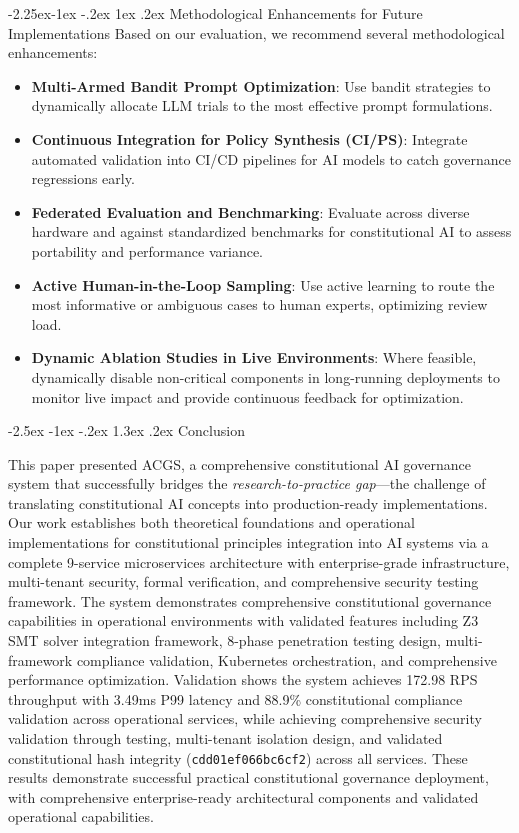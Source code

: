 \documentclass[manuscript,screen,9pt]{acmart}
\makeatletter
\renewcommand\section{\@startsection{section}{1}{\z@}%
  {-2.5ex \@plus -1ex \@minus -.2ex}%
  {1.3ex \@plus.2ex}%
  {\normalfont\Large\bfseries}}
\renewcommand\subsection{\@startsection{subsection}{2}{\z@}%
  {-2.25ex\@plus -1ex \@minus -.2ex}%
  {1ex \@plus .2ex}%
  {\normalfont\large\bfseries}}
\makeatother
\begin{document}
\subsection{Methodological Enhancements for Future Implementations}
\label{subsec:methodology_optimization}
Based on our evaluation, we recommend several methodological enhancements:
\begin{itemize}[leftmargin=*,itemsep=1pt,parsep=1pt]
	\item \textbf{Multi-Armed Bandit Prompt Optimization}: Use bandit strategies to dynamically allocate LLM trials to the most effective prompt formulations.
	\item \textbf{Continuous Integration for Policy Synthesis (CI/PS)}: Integrate automated validation into CI/CD pipelines for AI models to catch governance regressions early.
	\item \textbf{Federated Evaluation and Benchmarking}: Evaluate across diverse hardware and against standardized benchmarks for constitutional AI to assess portability and performance variance.
	\item \textbf{Active Human-in-the-Loop Sampling}: Use active learning to route the most informative or ambiguous cases to human experts, optimizing review load.
	\item \textbf{Dynamic Ablation Studies in Live Environments}: Where feasible, dynamically disable non-critical components in long-running deployments to monitor live impact and provide continuous feedback for optimization.
\end{itemize}


\section{Conclusion}
\label{sec:conclusion}

This paper presented ACGS, a comprehensive constitutional AI governance system that successfully bridges the \textit{research-to-practice gap}—the challenge of translating constitutional AI concepts into production-ready implementations. Our work establishes both theoretical foundations and operational implementations for constitutional principles integration into AI systems via a complete 9-service microservices architecture with enterprise-grade infrastructure, multi-tenant security, formal verification, and comprehensive security testing framework. The system demonstrates comprehensive constitutional governance capabilities in operational environments with validated features including Z3 SMT solver integration framework, 8-phase penetration testing design, multi-framework compliance validation, Kubernetes orchestration, and comprehensive performance optimization. Validation shows the system achieves 172.98 RPS throughput with 3.49ms P99 latency and 88.9\% constitutional compliance validation across operational services, while achieving comprehensive security validation through testing, multi-tenant isolation design, and validated constitutional hash integrity (\texttt{cdd01ef066bc6cf2\cite{perf-report}\cite{perf-report}}) across all services. These results demonstrate successful practical constitutional governance deployment, with comprehensive enterprise-ready architectural components and validated operational capabilities.
\end{document}
